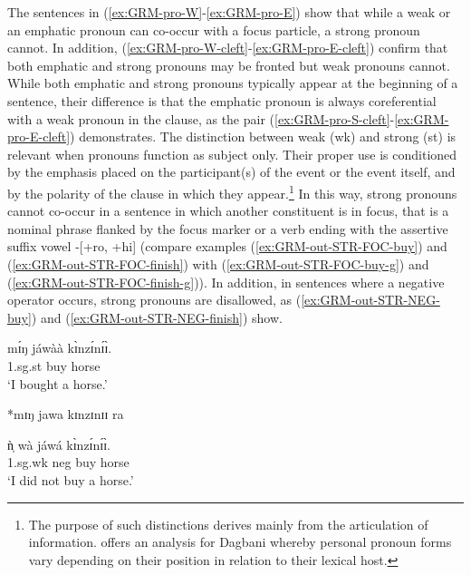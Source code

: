 \begin{exe}
\begin{exe}
\begin{exe}
{\begin{exe}
\begin{exe}
\begin{exe}
\begin{exe}
\begin{exe}
\begin{exe}
The sentences in (\ref{ex:GRM-pro-W}-\ref{ex:GRM-pro-E}) show that while a weak or 
an emphatic pronoun can co-occur with a  focus particle,  a strong pronoun 
cannot. In addition, (\ref{ex:GRM-pro-W-cleft}-\ref{ex:GRM-pro-E-cleft}) confirm that both 
emphatic and strong pronouns may be fronted but weak pronouns cannot.  While both emphatic and 
strong pronouns typically appear  at the beginning of a sentence, their difference is that  the   
emphatic pronoun is always coreferential with a weak pronoun in the clause,  
as 
the pair (\ref{ex:GRM-pro-S-cleft}-\ref{ex:GRM-pro-E-cleft}) demonstrates.   The  distinction 
between weak 
({\sc wk}) and strong 
({\sc st})  is relevant when pronouns function as subject only.  Their proper use is 
conditioned by the emphasis  placed on the participant(s) of the event or the 
event itself, and by the polarity of the clause in which they appear.\footnote{The purpose of such 
distinctions derives mainly from the articulation of information. \citet{Purv07} offers an analysis 
for Dagbani whereby personal pronoun forms vary depending on their position in relation to their 
lexical host.}  In this way, strong pronouns cannot co-occur in a sentence in which another
constituent is in focus, that is a nominal phrase  flanked by the focus
marker  or   a
verb ending with the assertive suffix vowel   {\sc -[+ro,  +hi]} (compare 
examples 
(\ref{ex:GRM-out-STR-FOC-buy}) and (\ref{ex:GRM-out-STR-FOC-finish}) with 
(\ref{ex:GRM-out-STR-FOC-buy-g}) and  (\ref{ex:GRM-out-STR-FOC-finish-g})). 
In
addition,  in
sentences 
where a negative operator occurs, strong pronouns are disallowed, as  
(\ref{ex:GRM-out-STR-NEG-buy}) and   (\ref{ex:GRM-out-STR-NEG-finish}) show.

\ea\label{ex:GRM-weak-strong-arg}\begin{multicols}{2}
   \ea\label{ex:GRM-out-STR-FOC-buy-g}
\gll   mɪ́ŋ   jáwàà   kɪ̀nzɪ́nɪ́ɪ̀.\\
  {\sc 1.sg.st}  buy  horse\\
\glt  `I bought a horse.' 

   \ex\label{ex:GRM-out-STR-FOC-buy}
 *mɪŋ   jawa   kɪnzɪnɪɪ ra
   
   
%    
   \ex\label{ex:}
\gll ǹ̩ wà jáwá kɪ̀nzɪ́nɪ́ɪ̀.\\
 {\sc 1.sg.wk} {\sc neg} buy  horse\\
\glt  `I did not buy a horse.' 
  


\end{multicols}
\end{exe}
\end{exe}
\end{exe}
\end{exe}
\end{exe}
\end{exe}}
\end{exe}
\end{exe}
\end{exe}
